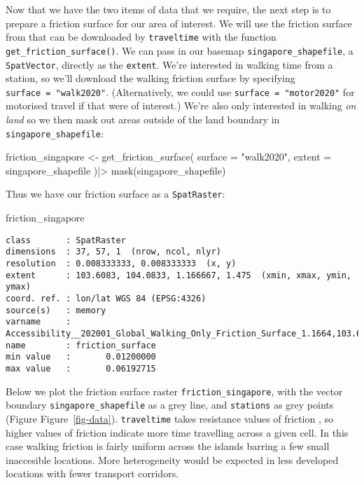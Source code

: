 \documentclass[
  12pt]{article}
\newenvironment{Shaded}{\begin{snugshade}}{\end{snugshade}}
\newcommand{\AttributeTok}[1]{\textcolor[rgb]{0.40,0.45,0.13}{#1}}
\newcommand{\FunctionTok}[1]{\textcolor[rgb]{0.28,0.35,0.67}{#1}}
\newcommand{\NormalTok}[1]{\textcolor[rgb]{0.00,0.23,0.31}{#1}}
\newcommand{\OtherTok}[1]{\textcolor[rgb]{0.00,0.23,0.31}{#1}}
\newcommand{\SpecialCharTok}[1]{\textcolor[rgb]{0.37,0.37,0.37}{#1}}
\newcommand{\StringTok}[1]{\textcolor[rgb]{0.13,0.47,0.30}{#1}}
\begin{document}
Now that we have the two items of data that we require, the next step is
to prepare a friction surface for our area of interest. We will use the
friction surface from \citet{weiss2020} that can be downloaded by
\texttt{traveltime} with the function \texttt{get\_friction\_surface()}.
We can pass in our basemap \texttt{singapore\_shapefile}, a
\texttt{SpatVector}, directly as the \texttt{extent}. We're interested
in walking time from a station, so we'll download the walking friction
surface by specifying \texttt{surface\ =\ "walk2020"}. (Alternatively,
we could use \texttt{surface\ =\ "motor2020"} for motorised travel if
that were of interest.) We're also only interested in walking \emph{on
land} so we then mask out areas outside of the land boundary in
\texttt{singapore\_shapefile}:

\begin{Shaded}
\begin{Highlighting}[]
\NormalTok{friction\_singapore }\OtherTok{\textless{}{-}} \FunctionTok{get\_friction\_surface}\NormalTok{(}
    \AttributeTok{surface =} \StringTok{"walk2020"}\NormalTok{,}
    \AttributeTok{extent =}\NormalTok{ singapore\_shapefile}
\NormalTok{  )}\SpecialCharTok{|\textgreater{}} 
  \FunctionTok{mask}\NormalTok{(singapore\_shapefile)}
\end{Highlighting}
\end{Shaded}

Thus we have our friction surface as a \texttt{SpatRaster}:

\begin{Shaded}
\begin{Highlighting}[]
\NormalTok{friction\_singapore}
\end{Highlighting}
\end{Shaded}

\begin{verbatim}
class       : SpatRaster 
dimensions  : 37, 57, 1  (nrow, ncol, nlyr)
resolution  : 0.008333333, 0.008333333  (x, y)
extent      : 103.6083, 104.0833, 1.166667, 1.475  (xmin, xmax, ymin, ymax)
coord. ref. : lon/lat WGS 84 (EPSG:4326) 
source(s)   : memory
varname     : Accessibility__202001_Global_Walking_Only_Friction_Surface_1.1664,103.6091,1.4714,104.0858 
name        : friction_surface 
min value   :       0.01200000 
max value   :       0.06192715 
\end{verbatim}

Below we plot the friction surface raster \texttt{friction\_singapore},
with the vector boundary \texttt{singapore\_shapefile} as a grey line,
and \texttt{stations} as grey points (Figure Figure~\ref{fig-data}).
\texttt{traveltime} takes resistance values of friction
\citep{gdistance2017}, so higher values of friction indicate more time
travelling across a given cell. In this case walking friction is fairly
uniform across the islands barring a few small inaccesible locations.
More heterogeneity would be expected in less developed locations with
fewer transport corridors.
\end{document}
